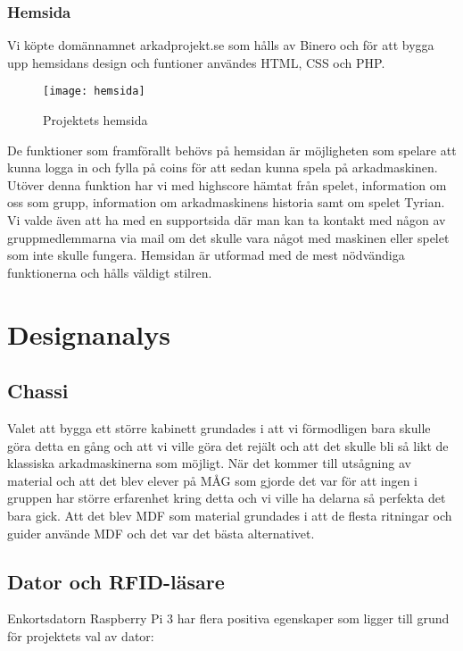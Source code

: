 \documentclass[12pt,fleqn,openany]{book} %
\begin{document}
\subsection{Hemsida}

Vi köpte domännamnet arkadprojekt.se som hålls av Binero och för att bygga upp hemsidans design och funtioner användes HTML, CSS och PHP.\bigskip
\begin{figure}[h]
\centering\texttt{[image: hemsida]}
\caption{Projektets hemsida}
\label{fig_hemsida}
\end{figure}
De funktioner som framförallt behövs på hemsidan är möjligheten som spelare att kunna logga in och fylla på coins för att sedan kunna spela 
på arkadmaskinen. Utöver denna funktion har vi med highscore hämtat från spelet, information om oss som grupp, information om arkadmaskinens 
historia samt om spelet Tyrian. Vi valde även att ha med en supportsida där man kan ta kontakt med någon av gruppmedlemmarna via mail om det 
skulle vara något med maskinen eller spelet som inte skulle fungera. Hemsidan är utformad med de mest nödvändiga funktionerna och hålls väldigt stilren.


\chapter{Designanalys}

\section{Chassi}
Valet att bygga ett större kabinett grundades i att vi förmodligen bara skulle göra detta en gång och att vi ville göra det rejält och att
det skulle bli så likt de klassiska arkadmaskinerna som möjligt. När det kommer till utsågning av material och att det blev elever på MÅG 
som gjorde det var för att ingen i gruppen har större erfarenhet kring detta och vi ville ha delarna så perfekta det bara gick. Att det blev 
MDF som material grundades i att de flesta ritningar och guider använde MDF och det var det bästa alternativet. 

\section{Dator och RFID-läsare}
Enkortsdatorn Raspberry Pi 3 har flera positiva egenskaper som ligger till grund för projektets val av dator:
\end{document}
